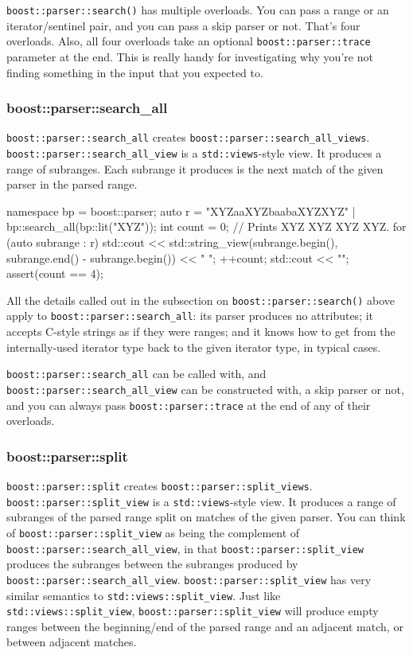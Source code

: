 \texttt{boost::parser::search()} has multiple overloads. You can pass a range or an iterator/sentinel pair, and you can pass a skip parser or not. That's four overloads. Also, all four overloads take an optional \texttt{boost::parser::trace} parameter at the end. This is really handy for investigating why you're not finding something in the input that you expected to.

\subsubsection{boost::parser::search\_all}

\texttt{boost::parser::search\_all} creates \texttt{boost::parser::search\_all\_views}. \texttt{boost::parser::search\_all\_view} is a \texttt{std::views}-style view. It produces a range of subranges. Each subrange it produces is the next match of the given parser in the parsed range.

\begin{code}
namespace bp = boost::parser;
auto r = "XYZaaXYZbaabaXYZXYZ" | bp::search_all(bp::lit("XYZ"));
int count = 0;
// Prints XYZ XYZ XYZ XYZ.
for (auto subrange : r) {
    std::cout << std::string_view(subrange.begin(), subrange.end() - subrange.begin()) << " ";
    ++count;
}
std::cout << "\n";
assert(count == 4);
\end{code}

All the details called out in the subsection on \texttt{boost::parser::search()} above apply to \texttt{boost::parser::search\_all}: its parser produces no attributes; it accepts C-style strings as if they were ranges; and it knows how to get from the internally-used iterator type back to the given iterator type, in typical cases.

\texttt{boost::parser::search\_all} can be called with, and \texttt{boost::parser::search\_all\_view} can be constructed with, a skip parser or not, and you can always pass \texttt{boost::parser::trace} at the end of any of their overloads.

\subsubsection{boost::parser::split}

\texttt{boost::parser::split} creates \texttt{boost::parser::split\_views}. \texttt{boost::parser::split\_view} is a \texttt{std::views}-style view. It produces a range of subranges of the parsed range split on matches of the given parser. You can think of \texttt{boost::parser::split\_view} as being the complement of \texttt{boost::parser::search\_all\_view}, in that \texttt{boost::parser::split\_view} produces the subranges between the subranges produced by \texttt{boost::parser::search\_all\_view}. \texttt{boost::parser::split\_view} has very similar semantics to \texttt{std::views::split\_view}. Just like \texttt{std::views::split\_view}, \texttt{boost::parser::split\_view} will produce empty ranges between the beginning/end of the parsed range and an adjacent match, or between adjacent matches.

